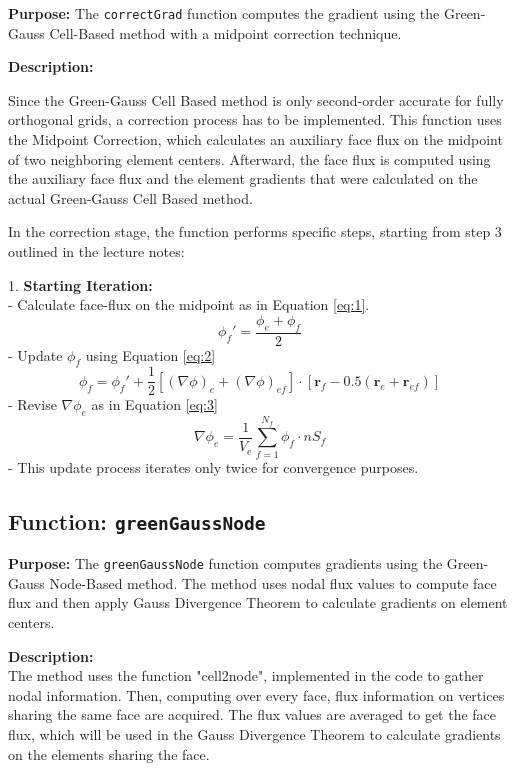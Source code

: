 \documentclass{article}
\begin{document}
\textbf{Purpose:} The \texttt{correctGrad} function computes the gradient using the Green-Gauss Cell-Based method with a midpoint correction technique.



\textbf{Description:}

Since the Green-Gauss Cell Based method is only second-order accurate for fully orthogonal grids, a correction process has to be implemented. This function uses the Midpoint Correction, which calculates an auxiliary face flux on the midpoint of two neighboring element centers. Afterward, the face flux is computed using the auxiliary face flux and the element gradients that were calculated on the actual Green-Gauss Cell Based method.

In the correction stage, the function performs specific steps, starting from step 3 outlined in the lecture notes:

1. \textbf{Starting Iteration:}\\
    - Calculate face-flux on the midpoint as in Equation \ref{eq:1}.
    \begin{equation}
        \phi_f' = \frac{\phi_e + \phi_f}{2}
        \label{eq:1}
    \end{equation}
   - Update $\phi_f$ using Equation \ref{eq:2}
     \begin{equation}
              \phi_f = \phi_f' + \frac{1}{2} \left[ (\nabla\phi)_e + (\nabla\phi)_{ef} \right] \cdot \left[ \mathbf{r}_f - 0.5 (\mathbf{r}_e + \mathbf{r}_{ef}) \right]
     \label{eq:2}
     \end{equation}
   - Revise $\nabla\phi_e$ as in Equation \ref{eq:3}
   \begin{equation}
       \nabla\phi_e = \frac{1}{V_e} \sum_{f=1}^{N_f} \phi_f \cdot nS_f
       \label{eq:3}
   \end{equation}
   - This update process iterates only twice for convergence purposes.

\subsection{Function: \texttt{greenGaussNode}}

\textbf{Purpose:} The \texttt{greenGaussNode} function computes gradients using the Green-Gauss Node-Based method. The method uses nodal flux values to compute face flux and then apply Gauss Divergence Theorem to calculate gradients on element centers.

\textbf{Description:} \\
The method uses the function "cell2node", implemented in the code to gather nodal information. Then, computing over every face, flux information on vertices sharing the same face are acquired. The flux values are averaged to get the face flux, which will be used in the Gauss Divergence Theorem to calculate gradients on the elements sharing the face.
\end{document}
